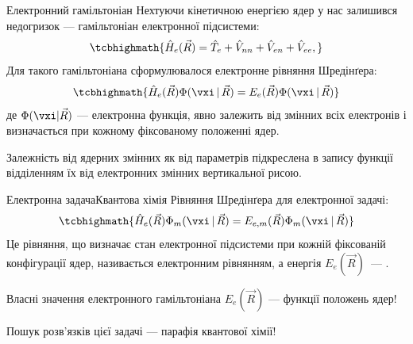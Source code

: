 \documentclass[]{beamer}
\begin{document}
\begin{frame}{Електронний гамільтоніан}{}
	Нехтуючи кінетичною енергією ядер  у нас залишився недогризок --- гамільтоніан \alert{електронної підсистеми}:
	\begin{equation*}
		\tcbhighmath{\hat{H}_e(\vec{R}) = \hat{T}_{e} +  \hat{V}_{nn} + \hat{V}_{en} + \hat{V}_{ee},}
	\end{equation*}
	Для такого гамільтоніана сформулювалося електронне рівняння Шредінґера:
	\begin{equation*}
		\tcbhighmath{\hat{H}_e(\vec{R}) \Phi(\vxi\, |\, \vec{R}) = E_e(\vec{R})\Phi(\vxi\,|\,\vec{R})}
	\end{equation*}
	де $\Phi(\vxi|\vec{R})$ --- електронна функція, явно залежить від змінних всіх електронів і визначається при кожному фіксованому положенні ядер.

	\begin{alertblock}{}\small\centering
		Залежність від ядерних змінних як від параметрів підкреслена в запису функції відділенням їх від електронних змінних вертикальної рисою.
	\end{alertblock}

\end{frame}





\begin{frame}{Електронна задача}{Квантова хімія}
	Рівняння Шредінґера для електронної задачі:
	\begin{equation*}
		\tcbhighmath{\hat{H}_e(\vec{R})\Phi_m(\vxi\,|\,\vec{R}) = E_{e,m}(\vec{R})\Phi_m(\vxi\,|\,\vec{R})}
	\end{equation*}
	Це рівняння, що визначає стан електронної підсистеми при кожній фіксованій конфігурації ядер, називається електронним рівнянням, а енергія  $E_e(\vec{R})$~--- .

	\begin{block}{}\centering
		Власні значення електронного гамільтоніана $E_e(\vec{R})$ --- функції положень ядер!
	\end{block}

	\begin{alertblock}{}\centering
		Пошук розв'язків цієї задачі --- парафія квантової хімії!
	\end{alertblock}
\end{frame}
\end{document}

